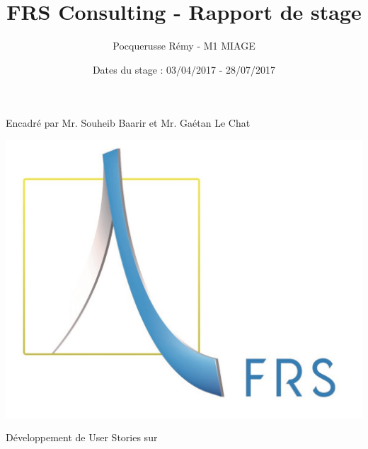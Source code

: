 \documentclass[french]{article}
\title{FRS Consulting - Rapport de stage}
\author{Pocquerusse Rémy - M1 MIAGE}
\date{Dates du stage : 03/04/2017 - 28/07/2017}
\begin{document}
\maketitle

\begin{center}
Encadré par Mr. Souheib Baarir et Mr. Gaétan Le Chat
\end{center}

\par\hfil\null\par
\par\hfil\null\par
\par\hfil\null\par
\par\hfil\null\par

\centerline{\includegraphics[scale=0.7, draft=false]{frs_logo.jpg}}

\par\hfil\null\par
\par\hfil\null\par
\par\hfil\null\par

\begin{center}
{\huge Développement de User Stories sur}
\newline{}
{\huge {}}
\end{center}

\clearpage
\end{document}
